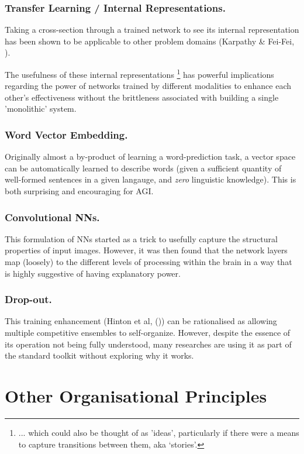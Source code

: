 \documentclass[citeauthoryear]{llncs}
\begin{document}
\subsubsection*{Transfer Learning / Internal Representations.}
Taking a cross-section through a trained network to see its internal representation
has been shown to be applicable to other problem domains (Karpathy \& Fei-Fei, \cite{karpathy2014deep}).

The usefulness of these internal representations
\footnote{ ... which could also be thought of as 'ideas', particularly 
if there were a means to capture transitions between them, aka `stories'.}
has powerful implications regarding the power of networks trained by 
different modalities to enhance each other's effectiveness without the 
brittleness associated with building a single 'monolithic' system.

\subsubsection*{Word Vector Embedding.}
Originally almost a by-product of learning a word-prediction task, a vector 
space can be automatically learned to describe words (given a sufficient
quantity of well-formed sentences in a given langauge, and \emph{zero} linguistic knowledge).
This is both surprising and encouraging for AGI.

\subsubsection*{Convolutional NNs.}
This formulation of NNs started as a trick to usefully capture 
the structural properties of input images.  
However, it was then found that the network layers map (loosely) 
to the different levels of processing within the brain in a way that is highly suggestive 
of having explanatory power.

\subsubsection*{Drop-out.}
This training enhancement (Hinton et al, (\cite{hinton-dropout})) 
can be rationalised as allowing multiple competitive ensembles to self-organize.  
However, despite the essence of its operation not being fully understood, 
many researches are using it as part of the standard toolkit without 
exploring why it works.


\section{Other Organisational Principles}
\end{document}
